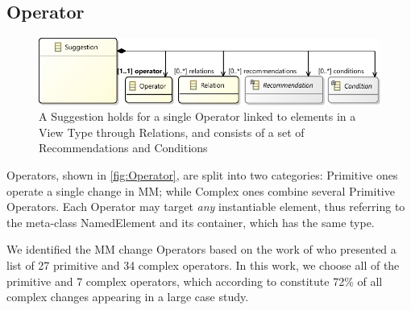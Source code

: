 \subsection{Operator}
\label{sec:Suggestion:Operator}

\begin{figure}[t]
    \centering
     \includegraphics[width=\columnwidth]{images/Suggestion.pdf}
    \caption{A \textsf{Suggestion} holds for a single \textsf{Operator} linked to 
		elements in a View Type through \textsf{Relation}s, and consists of a set of \textsf{Recommendation}s and \textsf{Condition}s} 
		\label{fig:Suggestion}
\end{figure}

\textsf{Operator}s, shown in \cref{fig:Operator}, are split into two categories:
\textsf{Primitive} ones operate a single change in \textsf{MM}; while
\textsf{Complex} ones combine several \textsf{Primitive} \textsf{Operator}s.
Each \textsf{Operator} may target \emph{any} instantiable \metamodel element, 
thus referring to the meta-class \textsf{NamedElement} and its container, which has the same type.

We identified the MM change \textsf{Operator}s based on the work of \textcite{herrmannsdoerfer_extensive_2011} who presented a list of 27 primitive and 34 complex operators. In this work, we choose all of the primitive and 7 complex operators, which according to \textcite{khelladi_detecting_2015} constitute 72\% of all complex changes appearing in a large case study.


